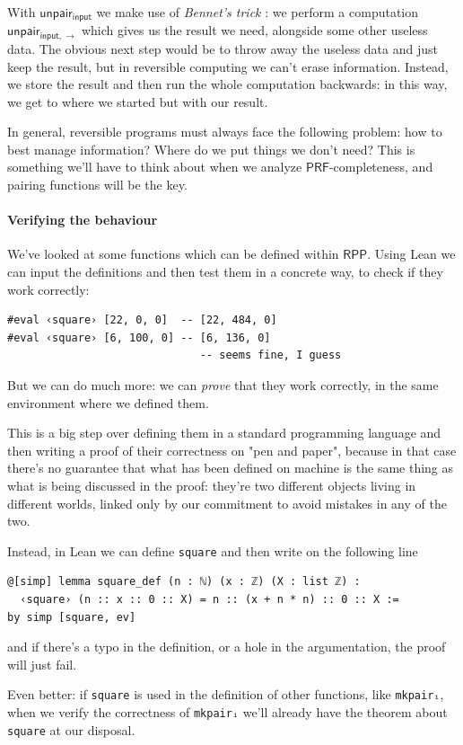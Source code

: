 \documentclass{book}
\theoremstyle{definition}
\theoremstyle{remark}
\theoremstyle{plain}
\newcommand{\RPP}{\mathsf{RPP}}
\newcommand{\rppunpairi}{\mathsf{unpair_{input}}}
\newcommand{\rppunpairifwd}{\mathsf{unpair_{input, \rightarrow}}}
\newcommand{\PRF}{\mathsf{PRF}}
\begin{document}
With $\rppunpairi$ we make use of \textit{Bennet's trick} \cite{perumalla2013chc}:
we perform a computation $\rppunpairifwd$ which gives us the result we need, alongside some other useless data.
The obvious next step would be to throw away the useless data and just keep the result,
but in reversible computing we can't erase information.
Instead, we store the result and then run the whole computation backwards:
in this way, we get to where we started but with our result.

In general, reversible programs must always face the following problem: how to best manage information?
Where do we put things we don't need?
This is something we'll have to think about when we analyze $\PRF$-completeness,
and pairing functions will be the key.

\paragraph*{Verifying the behaviour}

We've looked at some functions which can be defined within $\RPP$.
Using Lean we can input the definitions and then test them in a concrete way,
to check if they work correctly:
\begin{lstlisting}
#eval ‹square› [22, 0, 0]  -- [22, 484, 0]
#eval ‹square› [6, 100, 0] -- [6, 136, 0]
                              -- seems fine, I guess
\end{lstlisting}
But we can do much more: we can \textit{prove} that they work correctly,
in the same environment where we defined them.

This is a big step over defining them in a standard programming language and then
writing a proof of their correctness on "pen and paper",
because in that case there's no guarantee that what has been defined on machine
is the same thing as what is being discussed in the proof:
they're two different objects living in different worlds,
linked only by our commitment to avoid mistakes in any of the two.

Instead, in Lean we can define \lstinline{square} and then write on the following line
\begin{lstlisting}
@[simp] lemma square_def (n : ℕ) (x : ℤ) (X : list ℤ) :
  ‹square› (n :: x :: 0 :: X) = n :: (x + n * n) :: 0 :: X :=
by simp [square, ev]
\end{lstlisting}
and if there's a typo in the definition, or a hole in the argumentation,
the proof will just fail.

Even better: if \lstinline{square} is used in the definition of other functions,
like \lstinline{mkpairᵢ}, when we verify the correctness of \lstinline{mkpairᵢ}
we'll already have the theorem about \lstinline{square} at our disposal.
\end{document}
